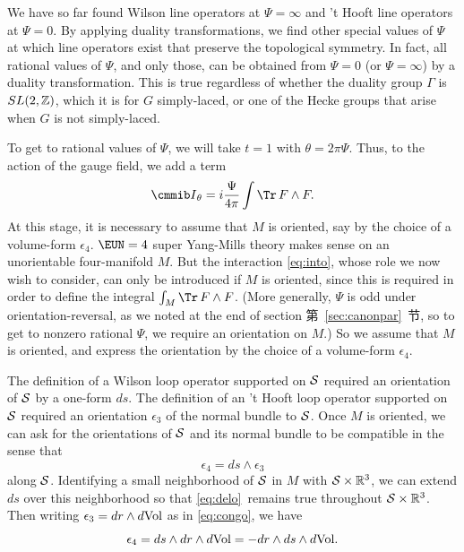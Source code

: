 \par{}

We have so far found Wilson line operators at $\Psi=\infty$ and 't
Hooft line operators at $\Psi=0$.  By applying
 duality transformations, we find other special values of
$\Psi$ at which line operators exist that preserve the topological
symmetry.  In fact, all rational values of $\Psi$, and only those,
can be obtained from $\Psi=0$ (or $\Psi=\infty$) by a duality
transformation.  This is true regardless of whether the duality
group $\Gamma$ is $SL(2,\Bbb{Z})$, which it is for $G$
simply-laced, or one of the Hecke groups that arise when $G$ is
not simply-laced.

To get to rational values of $\Psi$, we will take $t=1$ with
$\theta=2\pi \Psi$. Thus, to the action of the gauge field, we add
a term %
\setcounter{equation}{9}
\begin{equation}\label{eq:into}
{{\cmmib I}}_\theta=i{\Psi\over 4\pi}\int
\Tr\,F\wedge F.
\end{equation}
 At this stage, it is necessary to assume that $M$
is oriented, say by the choice of a volume-form $\epsilon_4$.
 ${\EUN}=4$ super Yang-Mills theory makes sense on an
unorientable four-manifold $M$.  But the interaction \eqref{eq:into}, whose
role we now wish to consider, can only be introduced if $M$ is
oriented, since this is required in order to define the integral
$\int_M\Tr\,F\wedge F$.  (More generally, $\Psi$ is odd under
orientation-reversal, as we noted at the end of section 第~\ref{sec:canonpar}~节,
so to get to nonzero rational $\Psi$, we require an orientation on
$M$.) So we assume that $M$ is oriented, and express the
orientation by the choice of a volume-form $\epsilon_4$.

The definition of a Wilson loop operator supported on ${\cal S}$
required an orientation of ${\cal S}$ by a one-form $ds$.  The
definition of an 't Hooft loop operator supported on ${\cal S}$
required an orientation $\epsilon_3$ of the normal bundle to
${\cal S}$.  Once $M$ is oriented, we can ask for the orientations
of ${\cal S}$ and its normal bundle to be compatible in the sense
that %
\setcounter{equation}{10}
\begin{equation}\label{eq:delo}
\epsilon_4=ds\wedge \epsilon_3
\end{equation}
 along ${\cal S}$.
Identifying a small neighborhood of ${\cal S}$ in $M$ with ${\cal
S}\times \Bbb{R}^3$, we can extend $ds$ over this neighborhood so
that \eqref{eq:delo}\ remains true throughout ${\cal S}\times \Bbb{R}^3$.
Then writing $\epsilon_3=dr\wedge d{\rm Vol}$ as in \eqref{eq:congo}, we
have %
\setcounter{equation}{11}
\begin{equation}\label{eq:nelo}
\epsilon_4=ds\wedge dr\wedge d{\rm Vol}=-dr\wedge
ds\wedge d{\rm Vol}.
\end{equation}

